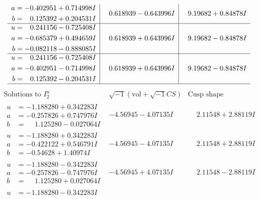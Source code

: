 \documentclass[1p]{elsarticle_modified}
\theoremstyle{definition}
\newcommand{\I}{\sqrt{-1}}
\begin{document}
$$\begin{array}{c|c|c}
\begin{aligned}
a &= -0.402951 + 0.714998 I \\
b &= \phantom{-}0.125392 + 0.204531 I\end{aligned}
 & \phantom{-}0.618939 - 0.643996 I & \phantom{-}9.19682 + 0.84878 I \\ \hline\begin{aligned}
u &= \phantom{-}0.241156 - 0.725408 I \\
a &= -0.685379 + 0.494659 I \\
b &= -0.082118 - 0.888085 I\end{aligned}
 & \phantom{-}0.618939 + 0.643996 I & \phantom{-}9.19682 - 0.84878 I \\ \hline\begin{aligned}
u &= \phantom{-}0.241156 - 0.725408 I \\
a &= -0.402951 - 0.714998 I \\
b &= \phantom{-}0.125392 - 0.204531 I\end{aligned}
 & \phantom{-}0.618939 + 0.643996 I & \phantom{-}9.19682 - 0.84878 I\\
 \hline 
 \end{array}$$\newpage$$\begin{array}{c|c|c}  
\text{Solutions to }I^u_{2}& \I (\text{vol} + \sqrt{-1}CS) & \text{Cusp shape}\\
 \hline 
\begin{aligned}
u &= -1.188280 + 0.342283 I \\
a &= -0.257826 + 0.747976 I \\
b &= \phantom{-}1.125280 - 0.027064 I\end{aligned}
 & -4.56945 - 4.07135 I & \phantom{-}2.11548 + 2.88119 I \\ \hline\begin{aligned}
u &= -1.188280 + 0.342283 I \\
a &= -0.422122 + 0.546791 I \\
b &= -0.54628 + 1.40974 I\end{aligned}
 & -4.56945 - 4.07135 I & \phantom{-}2.11548 + 2.88119 I \\ \hline\begin{aligned}
u &= -1.188280 - 0.342283 I \\
a &= -0.257826 - 0.747976 I \\
b &= \phantom{-}1.125280 + 0.027064 I\end{aligned}
 & -4.56945 + 4.07135 I & \phantom{-}2.11548 - 2.88119 I \\ \hline\begin{aligned}
u &= -1.188280 - 0.342283 I \\

\end{aligned}
\end{array}$$
\end{document}
